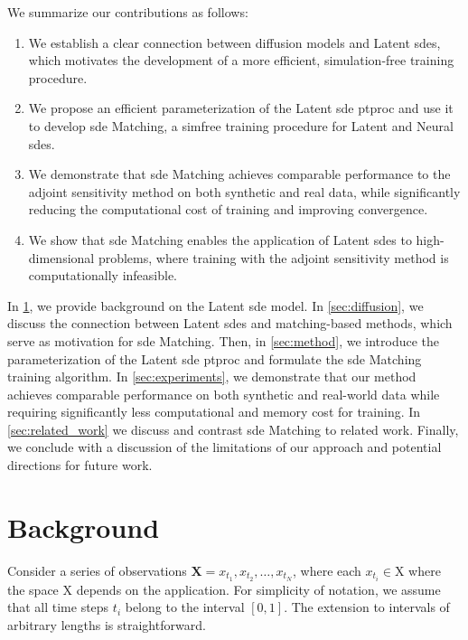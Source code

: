 \documentclass{article}
\def\X{\mathbf{X}}
\def\setX{\mathrm{X}}
\theoremstyle{plain}
\theoremstyle{definition}
\theoremstyle{remark}
\begin{document}
We summarize our contributions as follows:
\begin{enumerate}
    \item We establish a clear connection between diffusion models and Latent \glspl{sde}, which motivates the development of a more efficient, simulation-free training procedure.


    \item We propose an efficient parameterization of the Latent \gls{sde} \gls{ptproc} and use it to develop \gls{sde} Matching, a \gls{simfree} training procedure for Latent and Neural \glspl{sde}.


    \item We demonstrate that \gls{sde} Matching achieves comparable performance to the adjoint sensitivity method on both synthetic and real data, while significantly reducing the computational cost of training and improving convergence. 

    \item We show that \gls{sde} Matching enables the application of Latent \glspl{sde} to high-dimensional problems, where training with the adjoint sensitivity method is computationally infeasible.
\end{enumerate}


In \cref{sec:background}, we provide background on the Latent \gls{sde} model. In \cref{sec:diffusion}, we discuss the connection between Latent \glspl{sde} and matching-based methods, which serve as motivation for \gls{sde} Matching. Then, in \cref{sec:method}, we introduce the parameterization of the Latent \gls{sde} \gls{ptproc} and formulate the \gls{sde} Matching training algorithm. In \cref{sec:experiments}, we demonstrate that our method achieves comparable performance on both synthetic and real-world data while requiring significantly less computational and memory cost for training. In \cref{sec:related_work} we discuss and contrast \gls{sde} Matching to related work. Finally, we conclude with a discussion of the limitations of our approach and potential directions for future work.


\section{Background}
\label{sec:background}


Consider a series of observations ${\X = {x_{t_1}, x_{t_2}, \dots, x_{t_N}}}$, where each $x_{t_i} \in \setX$ where the space $\setX$ depends on the application. For simplicity of notation, we assume that all time steps $t_i$ belong to the interval $[0, 1]$. The extension to intervals of arbitrary lengths is straightforward.
\end{document}
